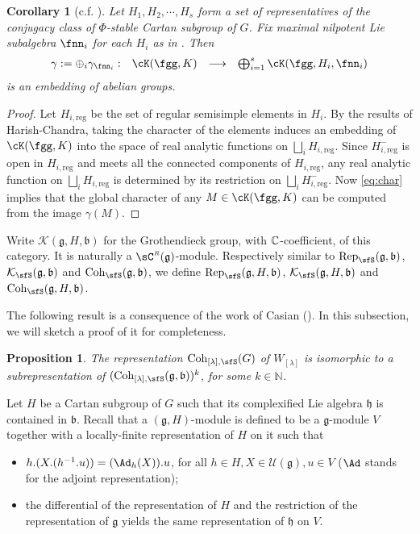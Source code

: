 \documentclass[12pt,a4paper]{amsart}
\newcommand{\BN}{{\mathbb {N}}}
\newcommand{\CK}{{\mathcal {K}}}
\newcommand{\CR}{{\mathcal {R}}}
\newcommand{\CU}{{\mathcal {U}}}
\newcommand{\g}{\mathfrak g}
\newcommand{\h}{\mathfrak h}
\renewcommand{\b}{\mathfrak b}
\numberwithin{equation}{section}
\newtheorem{prop}[thm]{Proposition}
\newtheorem{cor}[thm]{Corollary}
\theoremstyle{remark}
\def\CR{{\sC}^{\scriptscriptstyle R}}
\def\Coh{\mathrm{Coh}}
\def\Hireg{H_{i,\text{reg}}}
\def\Hnireg{H^-_{i,\text{reg}}}
\newcommand{\Lam}{{[\lambda]}}
\newcommand{\Grt}{\cK}
\begin{document}
\begin{cor}[c.f. {\cite{Mc}}]\label{cor:HC.embed}
  Let $H_{1}, H_{2}, \cdots, H_{s}$ form a set of representatives of the
  conjugacy class of $\Phi$-stable Cartan subgroup of $G$. Fix maximal
  nilpotent Lie subalgebra $\fnn_{i}$ for each $H_{i}$ as in
  . Then
  \[
    \begin{array}{cccc}
      \gamma:=\oplus_{i} \gamma_{\fnn_{i}}: &\Grt(\fgg,K)
      &\longrightarrow & \bigoplus_{i=1}^{s} \Grt(\fgg,H_{i},\fnn_{i})\\
    \end{array}
  \]
  is an embedding of abelian groups.
\end{cor}
\begin{proof}
  Let $\Hireg$ be the set of regular semisimple elements in $H_{i}$. By the
  results of Harish-Chandra, taking the character of the elements induces an
  embedding of $\Grt(\fgg,K)$ into the space of real analytic functions on
  $\bigsqcup_{i} \Hireg$. Since $\Hnireg$ is open in $\Hireg$ and meets all the
  connected components of $\Hireg$, any real analytic function on
  $\bigsqcup_{i} \Hireg$ is determined by its restriction on
  $\bigsqcup_{i} \Hnireg$. Now \eqref{eq:char} implies that the global character
  of any $M\in \Grt(\fgg,K)$ can be computed from the image $\gamma(M)$.
\end{proof}


Write $\CK(\g,H,\b)$ for the Grothendieck group, with $\mathbb{C}$-coefficient, of this category. It is naturally a $\CR(\g)$-module. Respectively similar to  $\Rep_\sfS(\g,\b)$, $\CK_\sfS(\g,\b)$ and  $\Coh_\sfS(\g,\b)$, we define $\Rep_\sfS(\g,H,\b)$, $\CK_\sfS(\g,H, \b)$ and  $\Coh_\sfS(\g,H, \b)$.




The following result is a consequence of the work of Casian (\cite{Cas}). In this subsection, we will sketch a proof of it for completeness.
 \begin{prop}\label{lem22}
The representation $\Coh_{\Lam,\sfS}(G)$ of $W_{[\lambda]}$ is isomorphic to a subrepresentation of $(\Coh_{\Lam,\sfS}(\g,\b))^k$, for some $k\in \BN$.
     \end{prop}


     Let $H$ be a Cartan subgroup of $G$ such that its complexified Lie algebra $\h$ is contained in $\b$. Recall that a $(\g, H)$-module is defined to be a $\g$-module $V$ together with a locally-finite representation of $H$ on it such that
     \begin{itemize}
     \item
        $h.(X.(h^{-1}.u))=(\Ad_h(X)).u$, for all $h\in H, X\in \CU(\g), u\in V$ ($\Ad$ stands for the adjoint representation);
        \item the differential of the representation of $H$ and the restriction of the representation of $\g$ yields the same representation of $\h$ on $V$.
     \end{itemize}
\end{document}
